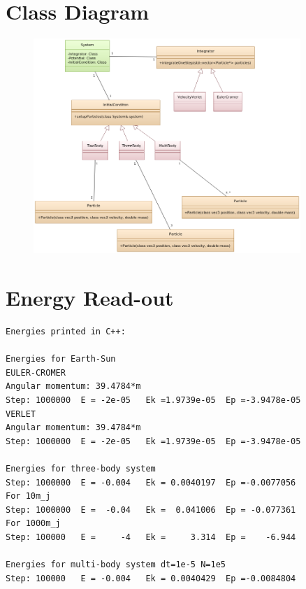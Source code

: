 \documentclass[10pt,a4paper]{amsart}
\begin{document}
\begin{appendix}

\section{Class Diagram}
\label{app:classdiagram}

\begin{figure}[ht]
	\centering
	\includegraphics[width=0.9\textwidth]{../figures/classdiagram.png}
\end{figure}

\section{Energy Read-out}
\label{app:energy}
\begin{lstlisting}[keywordstyle=\ttfamily, identifierstyle=\ttfamily]
Energies printed in C++:

Energies for Earth-Sun
EULER-CROMER
Angular momentum: 39.4784*m
Step: 1000000  E = -2e-05   Ek =1.9739e-05  Ep =-3.9478e-05
VERLET
Angular momentum: 39.4784*m
Step: 1000000  E = -2e-05   Ek =1.9739e-05  Ep =-3.9478e-05

Energies for three-body system
Step: 1000000  E = -0.004   Ek = 0.0040197  Ep =-0.0077056
For 10m_j
Step: 1000000  E =  -0.04   Ek =  0.041006  Ep = -0.077361
For 1000m_j
Step: 100000   E =     -4   Ek =     3.314  Ep =    -6.944

Energies for multi-body system dt=1e-5 N=1e5
Step: 100000   E = -0.004   Ek = 0.0040429  Ep =-0.0084804
\end{lstlisting}

\end{appendix}
\end{document}
